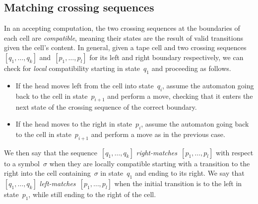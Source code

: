\subsection{Matching crossing sequences}
In an accepting computation, the two crossing sequences at the boundaries of each cell are \emph{compatible}, meaning their states are the result of valid transitions given the cell's content.
In general, given a tape cell and two crossing sequences~$[q_1,\dots,q_k]$ and~$[p_1,\dots,p_l]$ for its left and right boundary respectively, we can check for \emph{local} compatibility starting in state~$q_1$ and proceeding as follows.
\begin{itemize}
	\item If the head moves left from the cell into state~$q_i$, assume the automaton going back to the cell in state~$p_{i+1}$ and perform a move, checking that it enters the next state of the crossing sequence of the correct boundary.
	\item If the head moves to the right in state~$p_i$, assume the automaton going back to the cell in state~$p_{i+1}$ and perform a move as in the previous case.
\end{itemize}

We then say that the sequence~$[q_1,\dots,q_k]$ \emph{right-matches}~$[p_1,\dots,p_l]$ with respect to a symbol~$\sigma$ when they are locally compatible starting with a transition to the right into the cell containing~$\sigma$ in state~$q_1$ and ending to its right.
We say that~$[q_1,\dots,q_k]$ \emph{left-matches}~$[p_1,\dots,p_l]$ when the initial transition is to the left in state~$p_1$, while still ending to the right of the cell.

